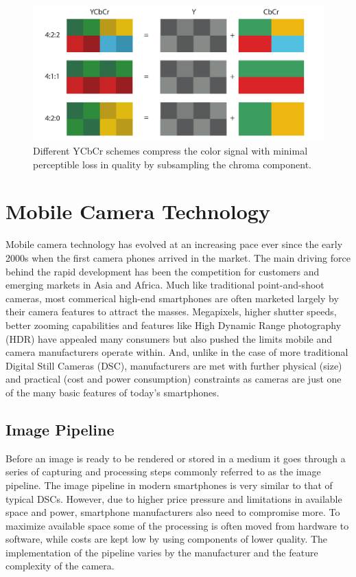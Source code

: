 \documentclass[thesis.tex]{subfiles}
\begin{document}
\begin{figure}[h]
\centering \includegraphics[width=\textwidth]{images/ycbcr}
\caption{Different YCbCr schemes compress the color signal with minimal perceptible loss in quality by subsampling the chroma component.\label{figure:ycbcr}}
\end{figure}

\section{Mobile Camera Technology}
\label{section:mobile_camera_technology}
Mobile camera technology has evolved at an increasing pace ever since the early 2000s when the first camera phones arrived in the market. The main driving force behind the rapid development has been the competition for customers and emerging markets in Asia and Africa. Much like traditional point-and-shoot cameras, most commerical high-end smartphones are often marketed largely by their camera features to attract the masses. Megapixels, higher shutter speeds, better zooming capabilities and features like High Dynamic Range photography (HDR) have appealed many consumers but also pushed the limits mobile and camera manufacturers operate within. And, unlike in the case of more traditional Digital Still Cameras (DSC), manufacturers are met with further physical (size) and practical (cost and power consumption) constraints as cameras are just one of the many basic features of today's smartphones.

\subsection{Image Pipeline}
Before an image is ready to be rendered or stored in a medium it goes through a series of capturing and processing steps commonly referred to as the image pipeline. The image pipeline in modern smartphones is very similar to that of typical DSCs. However, due to higher price pressure and limitations in available space and power, smartphone manufacturers also need to compromise more. To maximize available space some of the processing is often moved from hardware to software, while costs are kept low by using components of lower quality. The implementation of the pipeline varies by the manufacturer and the feature complexity of the camera.
\end{document}
